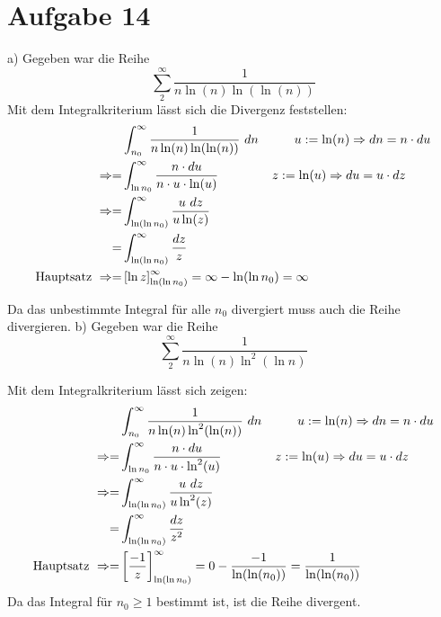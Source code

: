 \documentclass[10pt]{article}
\begin{document}
\newpage
\setlength{\headheight}{0cm}

\section*{Aufgabe 14}

a) Gegeben war die Reihe
\[
	\sum_2^\infty \frac{1}{n \ln(n) \ln(\ln(n))}
\]
Mit dem Integralkriterium lässt sich die Divergenz feststellen:
\begin{align*}
	&\int_{n_0}^\infty \frac{1}{n \ln(n) \ln(\ln(n))} \ dn \hspace{1cm}
	u := \ln(n) \Rightarrow dn = n \cdot du \\
	\Rightarrow 
	= &\int_{\ln n_0}^\infty \frac{n \cdot du}{n \cdot u \cdot \ln(u)} 
	\hspace{1.5cm} z := \ln(u) \Rightarrow du = u \cdot dz \\
	\Rightarrow
	= &\int_{\ln(\ln n_0)}^\infty \frac{u \ dz}{u \ln(z)} \\
	= &\int_{\ln(\ln n_0)}^\infty \frac{dz}{z} \\
	\text{Hauptsatz } \Rightarrow =
	& \left[\ln z \right]_{\ln(\ln n_0)}^\infty = \infty - \ln(\ln n_0)
	= \infty
\end{align*}

Da das unbestimmte Integral für alle $n_0$ divergiert muss auch die Reihe 
divergieren. \newline
\vspace{0.5cm}
\newline
b) Gegeben war die Reihe 
\[
	\sum_2^\infty \frac1{n \ln(n) \ln^2(\ln n)}
\]

Mit dem Integralkriterium lässt sich zeigen:
\begin{align*}
	&\int_{n_0}^\infty \frac{1}{n \ln(n) \ln^2(\ln(n))} \ dn 
	\hspace{1cm}
	u := \ln(n) \Rightarrow dn = n \cdot du \\
	\Rightarrow 
	= &\int_{\ln n_0}^\infty \frac{n \cdot du}{n \cdot u \cdot 
	\ln^2(u)} 
	\hspace{1.5cm} z := \ln(u) \Rightarrow du = u \cdot dz \\
	\Rightarrow
	= &\int_{\ln(\ln n_0)}^\infty \frac{u \ dz}{u \ln^2(z)} \\
	= &\int_{\ln(\ln n_0)}^\infty \frac{dz}{z^2} \\
	\text{Hauptsatz } \Rightarrow =
	& \left[\frac{-1}{z} \right]_{\ln(\ln n_0)}^\infty 
	=
	0 - \frac{-1}{\ln(\ln(n_0))} = \frac{1}{\ln(\ln(n_0))}
\end{align*}
Da das Integral für $n_0 \geq 1$  bestimmt ist, ist die Reihe divergent.
\end{document}
